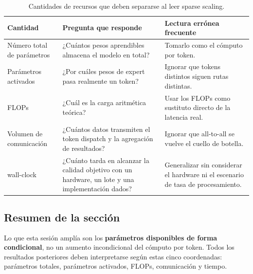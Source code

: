 \begin{table}[H]
\centering
\small
\caption{Cantidades de recursos que deben separarse al leer sparse scaling.}
\begin{tabularx}{\textwidth}{L{0.22\textwidth}X X}
\toprule
Cantidad & Pregunta que responde & Lectura errónea frecuente \\
\midrule
Número total de parámetros & ¿Cuántos pesos aprendibles almacena el modelo en total? & Tomarlo como el cómputo por token. \\
Parámetros activados & ¿Por cuáles pesos de expert pasa realmente un token? & Ignorar que tokens distintos siguen rutas distintas. \\
FLOPs & ¿Cuál es la carga aritmética teórica? & Usar los FLOPs como sustituto directo de la latencia real. \\
Volumen de comunicación & ¿Cuántos datos transmiten el token dispatch y la agregación de resultados? & Ignorar que all-to-all se vuelve el cuello de botella. \\
wall-clock & ¿Cuánto tarda en alcanzar la calidad objetivo con un hardware, un lote y una implementación dados? & Generalizar sin considerar el hardware ni el escenario de tasa de procesamiento. \\
\bottomrule
\end{tabularx}
\end{table}

\subsection{Resumen de la sección}

Lo que esta sesión amplía son los \textbf{parámetros disponibles de forma condicional}, no un aumento incondicional del cómputo por token. Todos los resultados posteriores deben interpretarse según estas cinco coordenadas: parámetros totales, parámetros activados, FLOPs, comunicación y tiempo.
